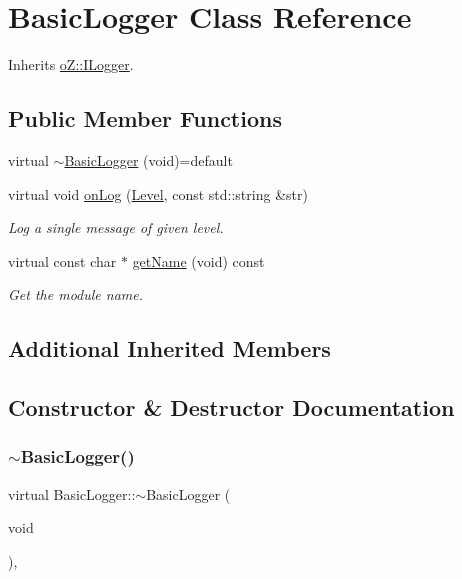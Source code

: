 \hypertarget{class_basic_logger}{}\section{Basic\+Logger Class Reference}
\label{class_basic_logger}


Inherits \mbox{\hyperlink{classo_z_1_1_i_logger}{o\+Z\+::\+I\+Logger}}.

\subsection*{Public Member Functions}
\begin{DoxyCompactItemize}
\item 
virtual \mbox{\hyperlink{class_basic_logger_a74c5e1f1c8b18830704f071dc6c021f0}{$\sim$\+Basic\+Logger}} (void)=default
\item 
virtual void \mbox{\hyperlink{class_basic_logger_a91033a43cfba1ab9235f1c7d035ff890}{on\+Log}} (\mbox{\hyperlink{namespaceo_z_a72fc7662d5f07391ac6f0a5699014bfa}{Level}}, const std\+::string \&str)
\begin{DoxyCompactList}\small\item\em Log a single message of given level. \end{DoxyCompactList}\item 
virtual const char $\ast$ \mbox{\hyperlink{class_basic_logger_a832838fa70c5910babd911b767a5f6f7}{get\+Name}} (void) const
\begin{DoxyCompactList}\small\item\em Get the module name. \end{DoxyCompactList}\end{DoxyCompactItemize}
\subsection*{Additional Inherited Members}


\subsection{Constructor \& Destructor Documentation}
\mbox{\label{class_basic_logger_a74c5e1f1c8b18830704f071dc6c021f0}} 
\subsubsection{\texorpdfstring{$\sim$BasicLogger()}{~BasicLogger()}}
{\footnotesize\ttfamily virtual Basic\+Logger\+::$\sim$\+Basic\+Logger (\begin{DoxyParamCaption}\item[{void}]{ }\end{DoxyParamCaption})\hspace{0.3cm}{\ttfamily [virtual]}, {\ttfamily [default]}}



